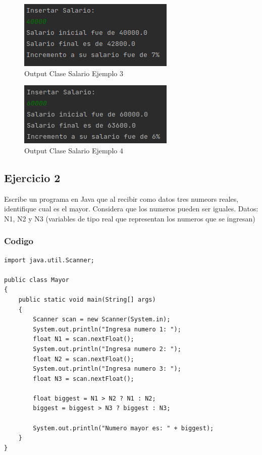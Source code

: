 \documentclass{article}
\begin{document}
\begin{figure}[h]
	\centering
	\includegraphics[scale = 1]{images/salario3.png}
	\caption{Output Clase Salario Ejemplo 3}
\end{figure}

\begin{figure}[h]
	\centering
	\includegraphics[scale = 1]{images/salario4.png}
	\caption{Output Clase Salario Ejemplo 4}
\end{figure}
\newpage

\subsection{Ejercicio 2}
Escribe un programa en Java que al recibir como datos tres numeors reales, identifique cual es el mayor. Considera que los numeros pueden ser iguales.
Datos: N1, N2 y N3 (variables de tipo real que representan los numeros que se ingresan)\\

\subsubsection{Codigo}

\begin{lstlisting}
import java.util.Scanner;

public class Mayor
{
	public static void main(String[] args)
	{
		Scanner scan = new Scanner(System.in);
		System.out.println("Ingresa numero 1: ");
		float N1 = scan.nextFloat();
		System.out.println("Ingresa numero 2: ");
		float N2 = scan.nextFloat();
		System.out.println("Ingresa numero 3: ");
		float N3 = scan.nextFloat();
		
		float biggest = N1 > N2 ? N1 : N2;
		biggest = biggest > N3 ? biggest : N3;
		
		System.out.println("Numero mayor es: " + biggest);
	}
}
\end{lstlisting}
\newpage
\end{document}
